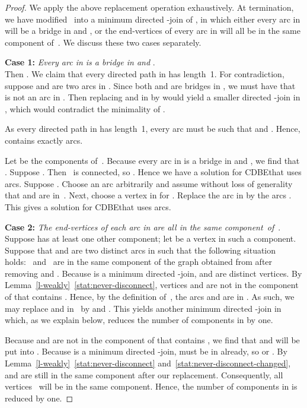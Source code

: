 \documentclass[11pt]{llncs}
\newcommand{\cdbe}{{\sc CDBE}}
\newcommand\displaycase[1]{{\bf #1}}
\begin{document}
\begin{proof}
We apply the above replacement operation exhaustively. At termination, we have
modified~ into a minimum directed -join of , in which either every
arc in  will be a bridge in  and , or the end-vertices
of every arc in  will all be in the same component of~.  We discuss these
two cases separately.

\medskip
\noindent
\displaycase{Case 1:} {\em Every arc in  is a bridge in  and }.\\ 
Then . We claim that every directed path in  has length~1.  For
contradiction, suppose  and  are two arcs in .  Since both
 and  are bridges in , we must have that  is not an arc
in .  Then replacing  and  in  by  would yield a
smaller directed -join in , which would contradict the minimality of
.

As every directed path in  has length~1, every arc  must
be such that  and .  Hence,  contains exactly 
arcs.

Let  be the components of~. Because every arc in  is a
bridge in  and , we find that .  Suppose
. Then~ is connected, so .  Hence we
have a solution for \cdbe that uses  arcs.  Suppose .
Choose an arc   arbitrarily and assume without loss of
generality that  and  are in~. Next, choose a vertex  in 
for .  Replace the arc  in  by the arcs
.  This gives a solution for
\cdbe that uses 
arcs. 

\medskip
\noindent
\displaycase{Case 2:} {\em The end-vertices of each arc in  are all in the same component~of~}.\\  
Suppose  has at least one other component; let  be a vertex in such a
component.  Suppose that  and  are two distinct arcs in  such
that the following situation holds:~ and~ are in the same component of
the graph obtained from  after removing  and .  Because  is
a minimum directed -join,  and  are distinct vertices.  By
Lemma~\ref{l-weakly}~\ref{stat:never-disconnect}, vertices  and  are not in the component of 
that contains .  Hence, by the definition of~, the arcs  and
 are in .  As such, we may replace  and  in~ by
 and .  This yields another minimum directed -join in 
which, as we explain below, reduces the number of components in  by one.

Because  and  are not in the component of  that contains , we find
that  and  will be put into . Because  is a minimum
directed -join,  must be in  already, so  or . By Lemma~\ref{l-weakly}~\ref{stat:never-disconnect} and~\ref{stat:never-disconnect-changed},~ and  are still in the
same component after our replacement.  Consequently, all vertices~
will be in the same  component.  Hence, the number of components in  is
reduced by one.


\end{proof}
\end{document}
